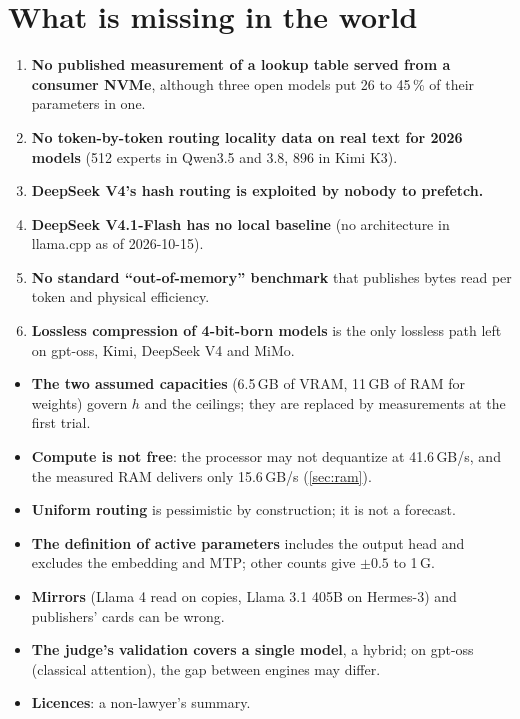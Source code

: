 \section{What is missing in the world}

\begin{enumerate}
\item \textbf{No published measurement of a lookup table served from a consumer NVMe}, although three open models put 26 to 45\,\% of their parameters in one.
\item \textbf{No token-by-token routing locality data on real text for 2026 models} (512 experts in Qwen3.5 and 3.8, 896 in Kimi K3).
\item \textbf{DeepSeek V4's hash routing is exploited by nobody to prefetch.}
\item \textbf{DeepSeek V4.1-Flash has no local baseline} (no architecture in llama.cpp as of 2026-10-15).
\item \textbf{No standard \enquote{out-of-memory} benchmark} that publishes bytes read per token and physical efficiency.
\item \textbf{Lossless compression of 4-bit-born models} is the only lossless path left on gpt-oss, Kimi, DeepSeek V4 and MiMo.
\end{enumerate}

\begin{faux}
\begin{itemize}
\item \textbf{The two assumed capacities} (6.5\,GB of VRAM, 11\,GB of RAM for weights) govern $h$ and the ceilings; they are replaced by measurements at the first trial.
\item \textbf{Compute is not free}: the processor may not dequantize at 41.6\,GB/s, and the measured RAM delivers only 15.6\,GB/s (\cref{sec:ram}).
\item \textbf{Uniform routing} is pessimistic by construction; it is not a forecast.
\item \textbf{The definition of active parameters} includes the output head and excludes the embedding and MTP; other counts give $\pm 0.5$ to 1\,G.
\item \textbf{Mirrors} (Llama 4 read on copies, Llama 3.1 405B on Hermes-3) and publishers' cards can be wrong.
\item \textbf{The judge's validation covers a single model}, a hybrid; on gpt-oss (classical attention), the gap between engines may differ.
\item \textbf{Licences}: a non-lawyer's summary.
\end{itemize}
\end{faux}
